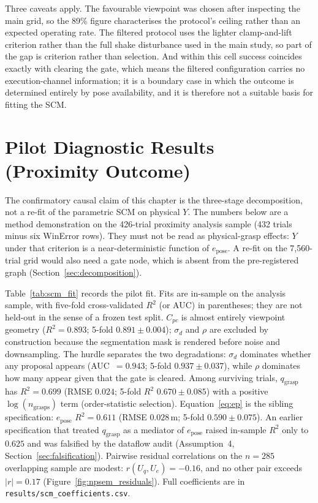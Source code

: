 \documentclass[11pt,a4paper]{report}
\begin{document}
Three caveats apply. The favourable viewpoint was chosen after inspecting the main grid, so the 89\% figure characterises the protocol's ceiling rather than an expected operating rate. The filtered protocol uses the lighter clamp-and-lift criterion rather than the full shake disturbance used in the main study, so part of the gap is criterion rather than selection. And within this cell success coincides exactly with clearing the gate, which means the filtered configuration carries no execution-channel information; it is a boundary case in which the outcome is determined entirely by pose availability, and it is therefore not a suitable basis for fitting the SCM.

\section{Pilot Diagnostic Results (Proximity Outcome)}
\label{sec:scm_fit}

The confirmatory causal claim of this chapter is the three-stage decomposition, not a re-fit of the parametric SCM on physical $Y$. The numbers below are a method demonstration on the 426-trial proximity analysis sample (432 trials minus six WinError rows). They must not be read as physical-grasp effects: $Y$ under that criterion is a near-deterministic function of $e_{\text{pose}}$. A re-fit on the 7{,}560-trial grid would also need a gate node, which is absent from the pre-registered graph (Section~\ref{sec:decomposition}).

Table~\ref{tab:scm_fit} records the pilot fit. Fits are in-sample on the analysis sample, with five-fold cross-validated $R^2$ (or AUC) in parentheses; they are not held-out in the sense of a frozen test split. $C_{pc}$ is almost entirely viewpoint geometry ($R^2 = 0.893$; 5-fold $0.891 \pm 0.004$); $\sigma_d$ and $\rho$ are excluded by construction because the segmentation mask is rendered before noise and downsampling. The hurdle separates the two degradations: $\sigma_d$ dominates whether any proposal appears (AUC~$= 0.943$; 5-fold $0.937 \pm 0.037$), while $\rho$ dominates how many appear given that the gate is cleared. Among surviving trials, $q_{\text{grasp}}$ has $R^2 = 0.699$ (RMSE $0.024$; 5-fold $R^2$ $0.670 \pm 0.085$) with a positive $\log(n_{\text{grasps}})$ term (order-statistic selection). Equation~\eqref{eq:ep} is the sibling specification: $e_{\text{pose}}$ $R^2 = 0.611$ (RMSE $0.028$\,m; 5-fold $0.590 \pm 0.075$). An earlier specification that treated $q_{\text{grasp}}$ as a mediator of $e_{\text{pose}}$ raised in-sample $R^2$ only to $0.625$ and was falsified by the dataflow audit (Assumption~4, Section~\ref{sec:falsification}). Pairwise residual correlations on the $n{=}285$ overlapping sample are modest: $r(U_q,U_e) = -0.16$, and no other pair exceeds $|r|{=}0.17$ (Figure~\ref{fig:npsem_residuals}). Full coefficients are in \texttt{results/scm\_coefficients.csv}.
\end{document}
